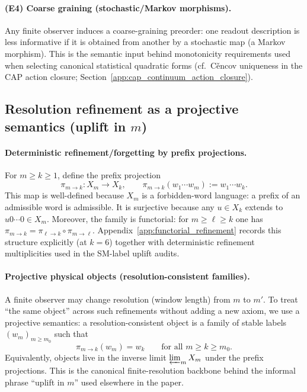 \paragraph{(E4) Coarse graining (stochastic/Markov morphisms).}
\InterfaceTag Any finite observer induces a coarse-graining preorder: one readout description is less informative if it is obtained from another by a stochastic map (a Markov morphism).
This is the semantic input behind monotonicity requirements used when selecting canonical statistical quadratic forms (cf.\ C{\v{e}}ncov uniqueness in the CAP action closure; Section~\ref{app:cap_continuum_action_closure}).
%
\subsection{Resolution refinement as a projective semantics (uplift in \texorpdfstring{$m$}{m})}
\label{subsec:resolution_projective_semantics}
\paragraph{Deterministic refinement/forgetting by prefix projections.}
\MathTag For $m\ge k\ge 1$, define the prefix projection
\[
\pi_{m\to k}:X_m\to X_k,\qquad
\pi_{m\to k}(w_1\cdots w_m):=w_1\cdots w_k.
\]
This map is well-defined because $X_m$ is a forbidden-word language: a prefix of an admissible word is admissible.
It is surjective because any $u\in X_k$ extends to $u0\cdots 0\in X_m$.
Moreover, the family is functorial: for $m\ge \ell\ge k$ one has $\pi_{m\to k}=\pi_{\ell\to k}\circ \pi_{m\to \ell}$.
Appendix~\ref{app:functorial_refinement} records this structure explicitly (at $k=6$) together with deterministic refinement multiplicities used in the SM-label uplift audits.

\paragraph{Projective physical objects (resolution-consistent families).}
\InterfaceTag A finite observer may change resolution (window length) from $m$ to $m'$.
To treat ``the same object'' across such refinements without adding a new axiom, we use a projective semantics:
a resolution-consistent object is a family of stable labels $(w_m)_{m\ge m_0}$ such that
\[
\pi_{m\to k}(w_m)=w_k\qquad\text{for all }m\ge k\ge m_0.
\]
Equivalently, objects live in the inverse limit $\varprojlim_{m} X_m$ under the prefix projections.
This is the canonical finite-resolution backbone behind the informal phrase ``uplift in $m$'' used elsewhere in the paper.

